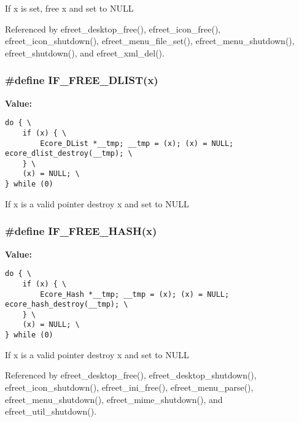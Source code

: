 If x is set, free x and set to NULL 

Referenced by efreet\_\-desktop\_\-free(), efreet\_\-icon\_\-free(), efreet\_\-icon\_\-shutdown(), efreet\_\-menu\_\-file\_\-set(), efreet\_\-menu\_\-shutdown(), efreet\_\-shutdown(), and efreet\_\-xml\_\-del().
\subsubsection[IF\_\-FREE\_\-DLIST]{\setlength{\rightskip}{0pt plus 5cm}\#define IF\_\-FREE\_\-DLIST(x)}\label{group__Efreet__Private_gcd7b583c33297ee7e359b055767fed34}


\textbf{Value:}

\begin{Code}\begin{verbatim}do { \
    if (x) { \
        Ecore_DList *__tmp; __tmp = (x); (x) = NULL; ecore_dlist_destroy(__tmp); \
    } \
    (x) = NULL; \
} while (0)
\end{verbatim}
\end{Code}
If x is a valid pointer destroy x and set to NULL 
\subsubsection[IF\_\-FREE\_\-HASH]{\setlength{\rightskip}{0pt plus 5cm}\#define IF\_\-FREE\_\-HASH(x)}\label{group__Efreet__Private_g2ef24d62b8a9a79cd511410826b1908d}


\textbf{Value:}

\begin{Code}\begin{verbatim}do { \
    if (x) { \
        Ecore_Hash *__tmp; __tmp = (x); (x) = NULL; ecore_hash_destroy(__tmp); \
    } \
    (x) = NULL; \
} while (0)
\end{verbatim}
\end{Code}
If x is a valid pointer destroy x and set to NULL 

Referenced by efreet\_\-desktop\_\-free(), efreet\_\-desktop\_\-shutdown(), efreet\_\-icon\_\-shutdown(), efreet\_\-ini\_\-free(), efreet\_\-menu\_\-parse(), efreet\_\-menu\_\-shutdown(), efreet\_\-mime\_\-shutdown(), and efreet\_\-util\_\-shutdown().
